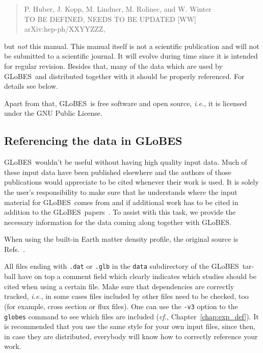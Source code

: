 \documentclass[a4paper,12pt,twoside]{book}
\newcommand{\glbxxxtwo}{hep-ph/XXYYZZZ}
\newcommand{\ie}{{\it i.e.}}
\newcommand{\cf}{{\it cf.}}
\newcommand{\Refs}{Refs.}
\newcommand{\Chapt}{Chapter}
\newcommand{\GLOBES}{{\sf GLoBES}}
\begin{document}
\begin{quote}
P. Huber, J. Kopp, M. Lindner, M. Rolinec, and W. Winter\\
TO BE DEFINED, NEEDS TO BE UPDATED [WW]\\
arXiv:\glbxxxtwo,
\end{quote}
but \emph{not} this manual. This manual itself is not a scientific 
publication and will not be submitted to a scientific journal. 
It will evolve during time since it is intended for 
regular revision. Besides that, many of the data which are used by \GLOBES\ 
and distributed together with it should be properly referenced. 
For details see below.

Apart from that, \GLOBES\ is free software and open source, \ie, it is 
licensed under the GNU Public License.

\subsection*{Referencing the data in \GLOBES}
\label{ref_data}

\index{norm}{Referencing!data in \GLOBES}
\GLOBES\ wouldn't be useful without having high quality input data.
Much of these input data have been published elsewhere and the authors
of those publications would appreciate to be cited whenever their work
is used. It is solely the user's responsibility 
to make sure that he understands where the input material for \GLOBES\ comes
from and if additional work has to be cited in addition to the 
\GLOBES\ papers~\cite{globes_paper,globes_paper_two}. To assist with this task, we provide  the necessary information for the data coming along together with \GLOBES.

When using the built-in Earth matter density profile, the 
original source is \Refs~\cite{Dziewonski:1981xy,Stacey}.

All files ending with \verb+.dat+ or \verb+.glb+ 
in the \verb+data+ subdirectory of the \GLOBES\ tar-ball have on top a comment field which clearly indicates which studies should be
cited when using a certain file. Make sure that dependencies are correctly
tracked, \ie , in some cases files included by other files need to be 
checked, too (for example, cross section or flux files). One can use 
the \verb+-v3+ option to the \verb+globes+ command to see which files
are included (\cf, \Chapt~\ref{chap:exp_def}).
It is recommended that you use the same style for your own input files, since then, in case they are distributed, everybody will know how to correctly reference your work.
\end{document}
